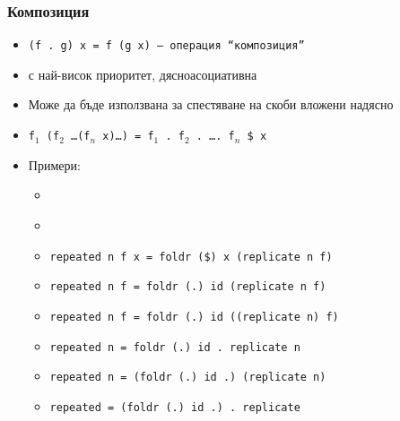 \documentclass{beamer}
\begin{document}
\begin{frame}
  \frametitle{Композиция}
  \begin{itemize}[<+->]
  \item \tt{(f . g) x = f (g x)} --- операция ``композиция''
  \item с най-висок приоритет, дясноасоциативна
  \item Може да бъде използвана за спестяване на скоби вложени надясно
  \item \tt{f$_1$ (f$_2$ \ldots (f$_n$ x)\ldots)} = \tt{f$_1$ . f$_2$ . \ldots . f$_n$ \$ x}
  \item Примери:
    \begin{itemize}
    \item \tt{}
    \item \tt{}
    \item \tt{repeated n f x = foldr (\$) x (replicate n f)}
    \item \tt{repeated n f = foldr (.) id (replicate n f)}
    \item \tt{repeated n f = foldr (.) id ((replicate n) f)}
    \item \tt{repeated n = foldr (.) id . replicate n}
    \item \tt{repeated n = (foldr (.) id .) (replicate n)}
    \item \tt{repeated = (foldr (.) id .) . replicate}
    \end{itemize}
  \end{itemize}
\end{frame}
\end{document}
